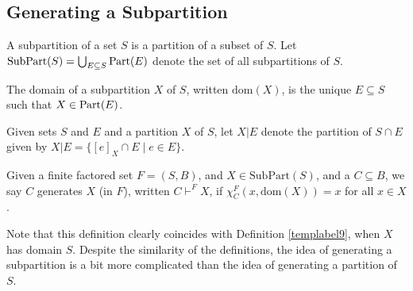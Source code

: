\documentclass[authordate,onecolumn]{miri-tech-article}
\begin{document}
\subsection{Generating a Subpartition}
\begin{definition}[subpartition]
A subpartition of a set $S$ is a partition of a subset of $S$. Let $\text{SubPart}(S)=\bigcup_{E\subseteq S}\parts[E]$ denote the set of all subpartitions of $S$.
\end{definition}
\begin{definition}[domain]
The domain of a subpartition $X$ of $S$, written $\text{dom}(X)$, is the unique $E\subseteq S$ such that $X\in\parts[E]$.
\end{definition}
\begin{definition}\label{defbare}
Given sets $S$ and $E$ and a partition $X$ of $S$, let $X|E$ denote the partition of $S\cap E$ given by $X|E=\{[e]_X\cap E\mid e\in E\}$.
\end{definition}
\begin{definition}\label{genasubpart}
Given a finite factored set $F=(S,B)$, and $X\in \text{SubPart}(S)$, and a $C\subseteq B$, we say $C$ generates $X$ (in $F$), written $C\vdash^F X$, if $\chi^F_C(x,\text{dom}(X))=x$ for all $x\in X$.
\end{definition}
Note that this definition clearly coincides with Definition \ref{templabel9}, when $X$ has domain $S$. Despite the similarity of the definitions, the idea of generating a subpartition is a bit more complicated than the idea of generating a partition of $S$.
\end{document}

